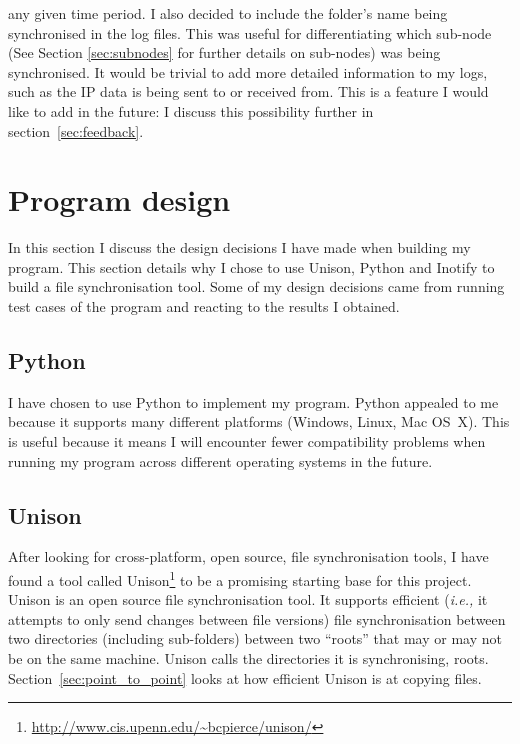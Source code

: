 \documentclass[12pt]{article}
\begin{document}
any given time period. I also decided to include
the folder's name being synchronised in the log files.
This was useful for differentiating which sub-node
(See Section \ref{sec:subnodes} for
further details on sub-nodes)
was being synchronised.
It would be trivial to add more detailed information to my logs,
such as the IP data is being sent to or received from.
This is a feature I would like to add in the future: I discuss this
possibility further in section~\ref{sec:feedback}.

\newpage
\section{Program design}
In this section I discuss the design decisions I have
made when building my program. This section details
why I chose to use Unison, Python and Inotify to
build a file synchronisation tool. Some of my design
decisions came from running test cases of the program
and reacting to the results I obtained.

\subsection{Python}
I have chosen to use Python to implement
my program. Python appealed to me because it
supports many different platforms (Windows, Linux, Mac OS~X).
This is useful because it means I will
encounter fewer compatibility problems when running
my program across different operating systems in the future.

\subsection{Unison}
\label{sec:unison}
After looking for cross-platform, open source, file synchronisation
tools, I have found a tool called
Unison\footnote{\url{http://www.cis.upenn.edu/~bcpierce/unison/}}
to be a promising starting
base for this project. Unison is an open source file synchronisation tool.
It supports efficient (\emph{i.e.,} it attempts to only send changes between file versions) file synchronisation between two
directories (including sub-folders) between two ``roots''
that may or may not be on the same machine. Unison calls the
directories it is synchronising, roots.
Section~\ref{sec:point_to_point} looks at how efficient Unison
is at copying files.
\end{document}
